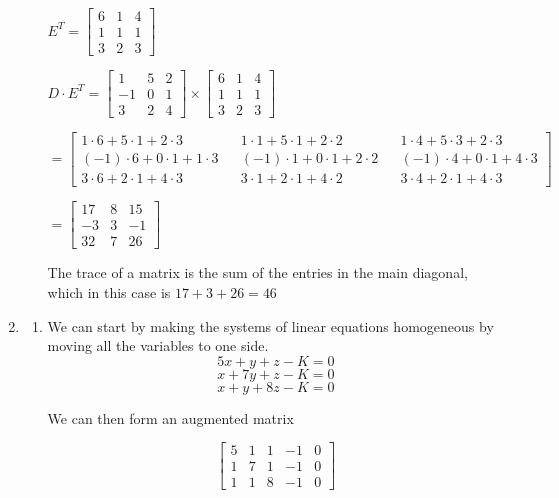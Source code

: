 \documentclass[11pt, letterpaper, twoside]{article}
\begin{document}
\begin{enumerate}
\begin{enumerate}[label=(\alph*)]
\hspace{6mm}$E^T=\begin{bmatrix}
6 & 1 & 4\\
1 & 1 & 1\\
3 & 2 & 3
\end{bmatrix}$

$D\cdot E^T = \begin{bmatrix}
1 & 5 & 2\\
-1 & 0 & 1\\
3 & 2 & 4
\end{bmatrix} \times
\begin{bmatrix}
6 & 1 & 4\\
1 & 1 & 1\\
3 & 2 & 3
\end{bmatrix}$

\hspace{12.5mm}$=\begin{bmatrix}
1\cdot 6 + 5\cdot 1+2\cdot 3 & &  1\cdot1+5\cdot1+2\cdot2 & & 1\cdot4+5\cdot3+2\cdot3\\
(-1)\cdot 6+0\cdot 1+1\cdot3 & & (-1)\cdot 1+0\cdot 1+2\cdot 2 & & (-1)\cdot 4+0\cdot 1+4\cdot 3\\
3\cdot6+2\cdot1+4\cdot 3 & & 3\cdot1+2\cdot1+4\cdot2 & & 3\cdot 4+2\cdot 1+4\cdot 3
\end{bmatrix}$


\hspace{12.5mm}$=\begin{bmatrix}
17 & 8 & 15\\
-3 & 3 & -1\\
32 & 7 & 26
\end{bmatrix}$

The trace of a matrix is the sum of the entries in the main diagonal, which in this case is $17+3+26=\boxed {46}$

\end{enumerate}
\item %
\begin{enumerate}[label=(\alph*)]

\item We can start by making the systems of linear equations homogeneous by moving all the variables to one side.
$$5x+y+z-K=0$$
$$x+7y+z-K=0$$
$$x+y+8z-K=0$$

We can then form an augmented matrix

$$\begin{bmatrix}
5 & 1 & 1 & -1 & 0\\
1 & 7 & 1 & -1 & 0\\
1 & 1 & 8 & -1 & 0
\end{bmatrix}$$


\end{enumerate}
\end{enumerate}
\end{document}
